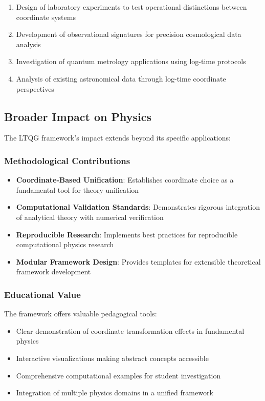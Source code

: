 \begin{enumerate}
\item Design of laboratory experiments to test operational distinctions between coordinate systems
\item Development of observational signatures for precision cosmological data analysis
\item Investigation of quantum metrology applications using log-time protocols
\item Analysis of existing astronomical data through log-time coordinate perspectives
\end{enumerate}

\subsection{Broader Impact on Physics}
\label{subsec:conclusion_broader_impact}

The LTQG framework's impact extends beyond its specific applications:

\subsubsection{Methodological Contributions}

\begin{itemize}
\item \textbf{Coordinate-Based Unification}: Establishes coordinate choice as a fundamental tool for theory unification
\item \textbf{Computational Validation Standards}: Demonstrates rigorous integration of analytical theory with numerical verification
\item \textbf{Reproducible Research}: Implements best practices for reproducible computational physics research
\item \textbf{Modular Framework Design}: Provides templates for extensible theoretical framework development
\end{itemize}

\subsubsection{Educational Value}

The framework offers valuable pedagogical tools:
\begin{itemize}
\item Clear demonstration of coordinate transformation effects in fundamental physics
\item Interactive visualizations making abstract concepts accessible
\item Comprehensive computational examples for student investigation
\item Integration of multiple physics domains in a unified framework
\end{itemize}

